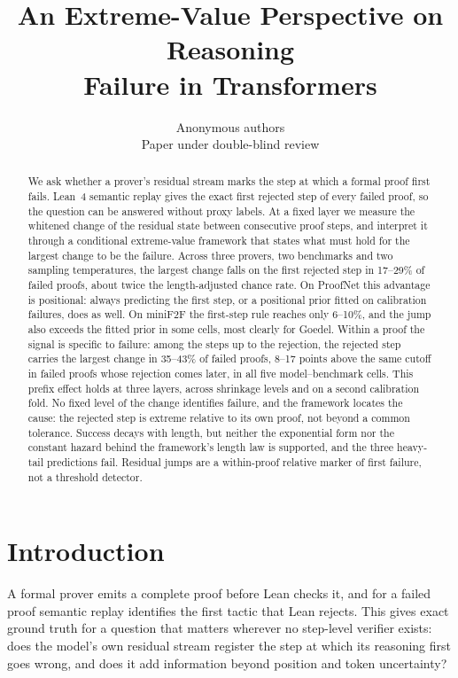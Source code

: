 \documentclass{article}
\title{An Extreme-Value Perspective on Reasoning\\ Failure in Transformers}
\author{Anonymous authors\\Paper under double-blind review}
\newcommand{\1}{\mathbf{1}}
\begin{document}
\maketitle

\begin{abstract}
We ask whether a prover's residual stream marks the step at which a formal proof first fails. Lean~4 semantic replay gives the exact first rejected step of every failed proof, so the question can be answered without proxy labels. At a fixed layer we measure the whitened change of the residual state between consecutive proof steps, and interpret it through a conditional extreme-value framework that states what must hold for the largest change to be the failure. Across three provers, two benchmarks and two sampling temperatures, the largest change falls on the first rejected step in 17--29\% of failed proofs, about twice the length-adjusted chance rate. On ProofNet this advantage is positional: always predicting the first step, or a positional prior fitted on calibration failures, does as well. On miniF2F the first-step rule reaches only 6--10\%, and the jump also exceeds the fitted prior in some cells, most clearly for Goedel. Within a proof the signal is specific to failure: among the steps up to the rejection, the rejected step carries the largest change in 35--43\% of failed proofs, 8--17 points above the same cutoff in failed proofs whose rejection comes later, in all five model--benchmark cells. This prefix effect holds at three layers, across shrinkage levels and on a second calibration fold. No fixed level of the change identifies failure, and the framework locates the cause: the rejected step is extreme relative to its own proof, not beyond a common tolerance. Success decays with length, but neither the exponential form nor the constant hazard behind the framework's length law is supported, and the three heavy-tail predictions fail. Residual jumps are a within-proof relative marker of first failure, not a threshold detector.
\end{abstract}

\section{Introduction}

A formal prover emits a complete proof before Lean checks it, and for a failed proof semantic replay identifies the first tactic that Lean rejects. This gives exact ground truth for a question that matters wherever no step-level verifier exists: does the model's own residual stream register the step at which its reasoning first goes wrong, and does it add information beyond position and token uncertainty?
\end{document}
